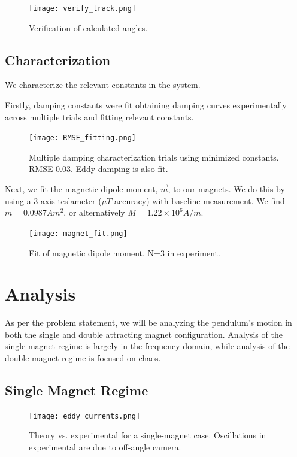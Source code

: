 \documentclass[prl,twocolumn,amsmath,amssymb,superscriptaddress]{revtex4-2}
\begin{document}
\begin{figure}[htb]
    \texttt{[image: verify\_track.png]}
    \caption{Verification of calculated angles.}
    \label{fig:verify_coords}
\end{figure}

\newpage
\subsection{Characterization}
We characterize the relevant constants in the system.

Firstly, damping constants were fit obtaining damping curves experimentally across multiple trials and fitting relevant constants.

\begin{figure}[htb]
    \texttt{[image: RMSE\_fitting.png]}
    \caption{Multiple damping characterization trials using minimized constants. RMSE 0.03. Eddy damping is also fit.}
    \label{fig:damping}
\end{figure}

Next, we fit the magnetic dipole moment, $\vec{m}$, to our magnets. We do this by using a 3-axis teslameter ($\mu T$ accuracy) with baseline measurement. We find $m =0.0987 Am^2$, or alternatively $M=1.22 \times 10^6 A/m$.

\begin{figure}[htb]
    \texttt{[image: magnet\_fit.png]}
    \caption{Fit of magnetic dipole moment. N=3 in experiment.}
    \label{fig:fit_field}
\end{figure}

\section{Analysis}
As per the problem statement, we will be analyzing the pendulum's motion in both the  single and double attracting magnet configuration. Analysis of the single-magnet regime is largely in the frequency domain, while analysis of the double-magnet regime is focused on chaos.

\subsection{Single Magnet Regime}

\begin{figure}[htb]
    \texttt{[image: eddy\_currents.png]}
    \caption{Theory vs. experimental for a single-magnet case. Oscillations in experimental are due to off-angle camera.}
\end{figure}
\end{document}
